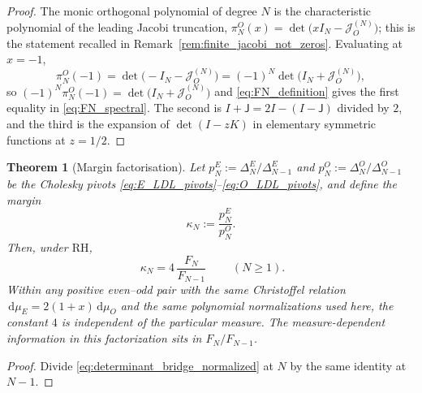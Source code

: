 \documentclass[11pt]{amsart}
\numberwithin{equation}{section}
\theoremstyle{plain}
\newtheorem{theorem}{Theorem}[section]
\theoremstyle{definition}
\theoremstyle{remark}
\newcommand{\RH}{\mathrm{RH}}
\newcommand{\J}{\mathsf J}
\newcommand{\dd}{\,\mathrm d}
\begin{document}
\begin{proof}
The monic orthogonal polynomial of degree $N$ is the characteristic polynomial of the
leading Jacobi truncation, $\pi_N^O(x)=\det\bigl(xI_N-\mathcal J_O^{(N)}\bigr)$; this is the
statement recalled in Remark~\ref{rem:finite_jacobi_not_zeros}.  Evaluating at $x=-1$,
\begin{equation}
 \pi_N^O(-1)=\det\bigl(-I_N-\mathcal J_O^{(N)}\bigr)=(-1)^N\det\bigl(I_N+\mathcal J_O^{(N)}\bigr),
\end{equation}
so $(-1)^N\pi_N^O(-1)=\det\bigl(I_N+\mathcal J_O^{(N)}\bigr)$ and \eqref{eq:FN_definition} gives the
first equality in \eqref{eq:FN_spectral}.  The second is $I+\J=2I-(I-\J)$ divided by $2$,
and the third is the expansion of $\det(I-zK)$ in elementary symmetric functions at
$z=1/2$.
\end{proof}

\begin{theorem}[Margin factorisation]
\label{thm:margin_factorisation}
Let $p_N^E:=\Delta_N^E/\Delta_{N-1}^E$ and $p_N^O:=\Delta_N^O/\Delta_{N-1}^O$ be the
Cholesky pivots \eqref{eq:E_LDL_pivots}--\eqref{eq:O_LDL_pivots}, and define the
\emph{margin}
\begin{equation}
 \kappa_N:=\frac{p_N^E}{p_N^O}.
 \label{eq:kappa_definition}
\end{equation}
Then, under $\RH$,
\begin{equation}
 \boxed{\;\kappa_N=4\,\frac{F_N}{F_{N-1}}\;}
 \qquad(N\ge1).
 \label{eq:margin_factorisation}
\end{equation}
Within any positive even--odd pair with the same Christoffel relation
\(\dd\mu_E=2(1+x)\dd\mu_O\) and the same polynomial normalizations used here, the
constant \(4\) is independent of the particular measure.  The measure-dependent
information in this factorization sits in \(F_N/F_{N-1}\).
\end{theorem}

\begin{proof}
Divide \eqref{eq:determinant_bridge_normalized} at $N$ by the same identity at $N-1$.
\end{proof}
\end{document}
